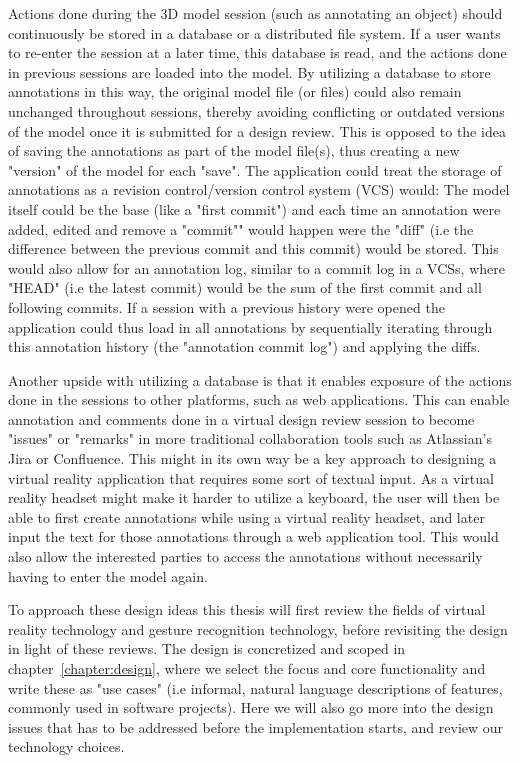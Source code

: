 Actions done during the 3D model session (such as annotating an object) should continuously be stored in a database or a distributed file system. 
If a user wants to re-enter the session at a later time, this database is read, and the actions done in previous sessions are loaded into the model.
By utilizing a database to store annotations in this way, the original model file (or files) could also remain unchanged throughout sessions, thereby avoiding conflicting 
or outdated versions of the model once it is submitted for a design review. This is opposed to the idea of saving the annotations as part of the model file(s), thus creating
a new "version" of the model for each "save".
The application could treat the storage of annotations as a revision control/version control system (VCS) would: The model itself could be the 
base (like a "first commit") and each time an annotation were added, edited and remove a "commit"" would happen were the "diff" (i.e the difference between the previous commit 
and this commit) would be stored. This would also allow for an annotation log, similar to a commit log in a VCSs, where "HEAD" (i.e the latest commit) would be the sum of the 
first commit and all following commits. 
If a session with a previous history were opened the application could thus load in all annotations by sequentially iterating through
this annotation history (the "annotation commit log") and applying the diffs.

Another upside with utilizing a database is that it enables exposure of the actions done in the sessions to other platforms, such as web applications. 
This can enable annotation and comments done in a virtual design review session to become "issues" or "remarks" in more traditional collaboration tools such as 
Atlassian's Jira or Confluence.
This might in its own way be a key approach to designing a virtual reality application that requires some sort of textual input. As a virtual reality headset might make
it harder to utilize a keyboard, the user will then be able to first create annotations while using a virtual reality headset, and 
later input the text for those annotations through a web application tool. This would also allow the interested parties to access the annotations without necessarily having
to enter the model again. 

To approach these design ideas this thesis will first review the fields of virtual reality technology and gesture recognition technology, before revisiting the design in light
of these reviews. The design is concretized and scoped in chapter~\vref{chapter:design}, where we select the focus and core functionality and write these as 
"use cases" (i.e informal, natural language descriptions of features, commonly used in software projects). Here we will also go more into the design issues that has to be
addressed before the implementation starts, and review our technology choices.  

